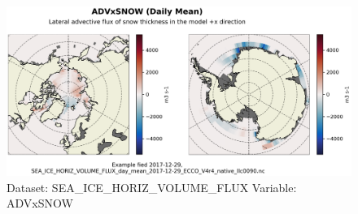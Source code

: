 \begin{figure}[H]
\centering
\includegraphics[scale=0.55]{../images/plots/native_plots/Sea-Ice_and_Snow_Horizontal_Volume_Fluxes/ADVxSNOW.png}
\caption{Dataset: SEA\_ICE\_HORIZ\_VOLUME\_FLUX Variable: ADVxSNOW}
\label{tab:table-SEA_ICE_HORIZ_VOLUME_FLUX_ADVxSNOW-Plot}
\end{figure}
\pagebreak
